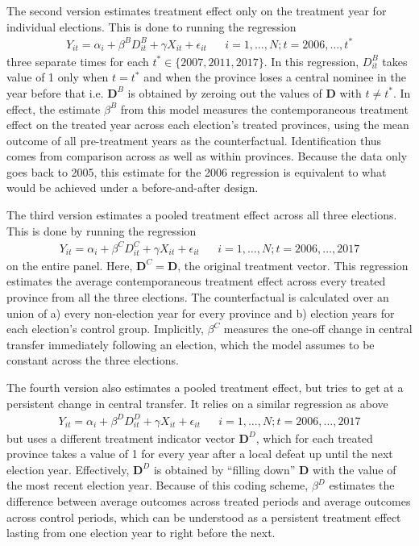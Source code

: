 \documentclass[12pt]{article}\usepackage[]{graphicx}\usepackage[]{color}
\newcommand{\1}{\mathbbm{1}}
\begin{document}
The second version estimates treatment effect only on the treatment year for individual elections. This is done to running the regression
\begin{align*}
		Y_{it} = \alpha_i + \beta^{B} D^{B}_{it} + \gamma X_{it} + \epsilon_{it} & &i = 1,\dots, N; t = 2006,\dots, t^*
		\tag{FE.2}\label{eq:FE.2}
\end{align*}
three separate times for each $t^* \in \{2007, 2011, 2017\}$. In this regression, $D^{B}_{it}$ takes value of 1 only when $t = t^*$ and when the province loses a central nominee in the year before that i.e. $\mathbf{D}^{B}$ is obtained by zeroing out the values of $\mathbf{D}$ with $t \neq t^*$. In effect, the estimate $\beta^{B}$ from this model measures the contemporaneous treatment effect on the treated year across each election's treated provinces, using the mean outcome of all pre-treatment years as the counterfactual. Identification thus comes from comparison across as well as within provinces. Because the data only goes back to 2005, this estimate for the 2006 regression is equivalent to what would be achieved under a before-and-after design.

The third version estimates a pooled treatment effect across all three elections. This is done by running the regression
\begin{align*}
	Y_{it} = \alpha_i + \beta^{C} D^{C}_{it} + \gamma X_{it} + \epsilon_{it} & &i = 1,\dots, N; t = 2006,\dots, 2017
	\tag{FE.3}\label{eq:FE.3}
\end{align*}
on the entire panel. Here, $\mathbf{D}^C = \mathbf{D}$, the original treatment vector. This regression estimates the average contemporaneous treatment effect across every treated province from all the three elections. The counterfactual is calculated over an union of a) every non-election year for every province and b) election years for each election's control group. Implicitly, $\beta^C$ measures the one-off change in central transfer immediately following an election, which the model assumes to be constant across the three elections.

The fourth version also estimates a pooled treatment effect, but tries to get at a persistent change in central transfer. It relies on a similar regression as above
\begin{align*}
	Y_{it} = \alpha_i + \beta^{D} D^{D}_{it} + \gamma X_{it} + \epsilon_{it} & &i = 1,\dots, N; t = 2006,\dots, 2017
	\tag{FE.4}\label{eq:FE.4}
\end{align*}
but uses a different treatment indicator vector $\mathbf{D}^D$, which for each treated province takes a value of 1 for every year after a local defeat up until the next election year. Effectively, $\mathbf{D}^D$ is obtained by ``filling down'' $\mathbf{D}$ with the value of the most recent election year. Because of this coding scheme, $\beta^D$ estimates the difference between average outcomes across treated periods and average outcomes across control periods, which can be understood as a persistent treatment effect lasting from one election year to right before the next.
\end{document}
